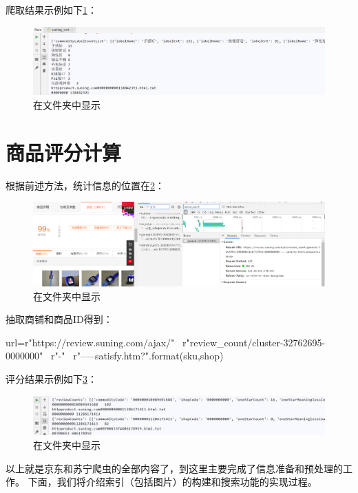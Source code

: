 爬取结果示例如下\ref{img:yhb100}：
\begin{figure}[htbp]
\centering
\includegraphics[width=13.5cm]{img/yhb/sn_res1.png}
\caption{在文件夹中显示}
\label{img:yhb100}   %
\end{figure}

\section{商品评分计算}

根据前述方法，统计信息的位置在\ref{img:yhb121}：
\begin{figure}[htbp]
\centering
\includegraphics[width=13.5cm]{img/yhb/sn_eg.png}
\caption{在文件夹中显示}
\label{img:yhb121}   %
\end{figure}

抽取商铺和商品ID得到：
\begin{python}
url=r"https://review.suning.com/ajax/" \
        r"review_count/cluster-32762695-0000000" \
        r"{}-{}" \
        r"-----satisfy.htm?".format(sku,shop)
\end{python}
评分结果示例如下\ref{img:yhb101}：
\begin{figure}[htbp]
\centering
\includegraphics[width=13.5cm]{img/yhb/sn_res2.png}
\caption{在文件夹中显示}
\label{img:yhb101}   %
\end{figure}


以上就是京东和苏宁爬虫的全部内容了，到这里主要完成了信息准备和预处理的工作。
下面，我们将介绍索引（包括图片）的构建和搜索功能的实现过程。




